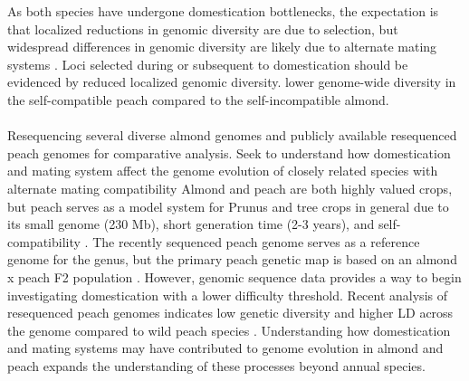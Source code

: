 \documentclass[12pt]{article}
\begin{document}
%
As both species have undergone domestication bottlenecks, the expectation is that localized reductions in genomic diversity are due to selection, but widespread differences in genomic diversity are likely due to alternate mating systems \citep{glemin2006impact, charlesworth2001breeding}. 
%
Loci selected during or subsequent to domestication should be evidenced by reduced localized genomic diversity.
%
lower genome-wide diversity in the self-compatible peach compared to the self-incompatible almond.
%
%
\\
\\
Resequencing several diverse almond genomes and publicly available resequenced peach genomes for comparative analysis. 
%
Seek to understand how domestication and mating system affect the genome evolution of closely related species with alternate mating compatibility
%
Almond and peach are both highly valued crops, but peach serves as a model system for Prunus and tree crops in general due to its small genome (230 Mb), short generation time (2-3 years), and self-compatibility \citep{arus2012peach}.
%
The recently sequenced peach genome \citep{verde2013high}serves as a reference genome for the genus, but the primary peach genetic map is based on an almond x peach F2 population \citep{arus2012peach, joobeur1998construction, aranzana2003set, dirlewanger2004comparative, dominguez2003plant}.
%
However, genomic sequence data provides a way to begin investigating domestication with a lower difficulty threshold.
%
Recent analysis of resequenced peach genomes indicates low genetic diversity and higher LD across the genome compared to wild peach species \citep{verde2013high}. 
%
%
Understanding how domestication and mating systems may have contributed to genome evolution in almond and peach expands the understanding of these processes beyond annual species. 
\end{document}
